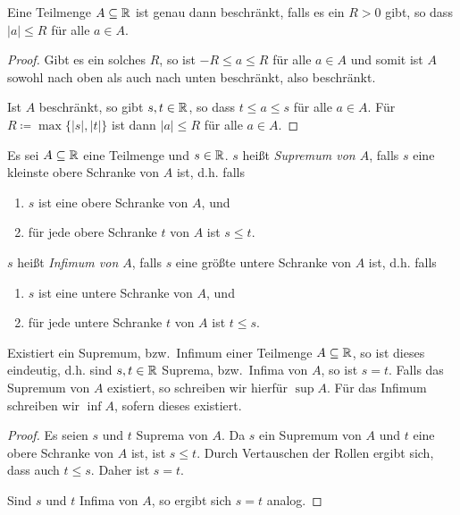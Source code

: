 \documentclass[a4paper,10pt]{article}
\begin{document}
\begin{bem}
 Eine Teilmenge $A \subseteq \mathbb{R}$ ist genau dann beschränkt, falls es ein $R > 0$ gibt, so dass $|a| \leq R$ für alle $a \in A$.
\end{bem}
\begin{proof}
 Gibt es ein solches $R$, so ist $-R \leq a \leq R$ für alle $a \in A$ und somit ist $A$ sowohl nach oben als auch nach unten beschränkt, also beschränkt.
 
 Ist $A$ beschränkt, so gibt $s, t \in \mathbb{R}$, so dass $t \leq a \leq s$ für alle $a \in A$. Für $R \coloneqq \max\{|s|, |t|\}$ ist dann $|a| \leq R$ für alle $a \in A$.
\end{proof}


\begin{defi}
 Es sei $A \subseteq \mathbb{R}$ eine Teilmenge und $s \in \mathbb{R}$. $s$ heißt \emph{Supremum von $A$}, falls $s$ eine kleinste obere Schranke von $A$ ist, d.h. falls
 \begin{enumerate}
  \item
   $s$ ist eine obere Schranke von $A$, und
  \item
   für jede obere Schranke $t$ von $A$ ist $s \leq t$.
 \end{enumerate}
 $s$ heißt \emph{Infimum von $A$}, falls $s$ eine größte untere Schranke von $A$ ist, d.h. falls
 \begin{enumerate}
  \item
   $s$ ist eine untere Schranke von $A$, und
  \item
   für jede untere Schranke $t$ von $A$ ist $t \leq s$.
 \end{enumerate}
\end{defi}


\begin{bem}
 Existiert ein Supremum, bzw.\ Infimum einer Teilmenge $A \subseteq \mathbb{R}$, so ist dieses eindeutig, d.h. sind $s,t \in \mathbb{R}$ Suprema, bzw.\ Infima von $A$, so ist $s = t$. Falls das Supremum von $A$ existiert, so schreiben wir hierfür $\sup A$. Für das Infimum schreiben wir $\inf A$, sofern dieses existiert.
\end{bem}
\begin{proof}
 Es seien $s$ und $t$ Suprema von $A$. Da $s$ ein Supremum von $A$ und $t$ eine obere Schranke von $A$ ist, ist $s \leq t$. Durch Vertauschen der Rollen ergibt sich, dass auch $t \leq s$. Daher ist $s = t$.
 
 Sind $s$ und $t$ Infima von $A$, so ergibt sich $s = t$ analog.
\end{proof}
\end{document}
